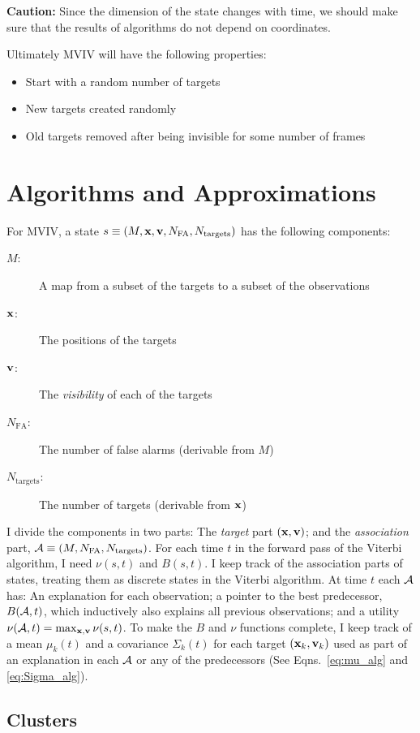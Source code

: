 \documentclass[12pt]{article}
\newcommand{\cA}{{\cal A}}
\begin{document}
\textbf{Caution:} Since the dimension of the state changes with time,
we should make sure that the results of algorithms do not depend on
coordinates.

Ultimately MVIV will have the following properties:
\begin{itemize}
\item Start with a random number of targets
\item New targets created randomly
\item Old targets removed after being invisible for some number of
  frames
\end{itemize}

\section{Algorithms and Approximations}
\label{sec:algorithms}

For MVIV, a state $s \equiv (M, {\mathbf{x}}, {\mathbf{v}}, N_{\text{FA}},
N_{\text{targets}})$ has the following components:
\begin{description}
\item[$M$:] A map from a subset of the targets to a subset of the observations
\item[${\mathbf{x}}$:] The positions of the targets
\item[${\mathbf{v}}$:] The \emph{visibility} of each of the targets
\item[$N_{\text{FA}}$:] The number of false alarms (derivable from $M$)
\item[$N_{\text{targets}}$:] The number of targets (derivable from ${\mathbf{x}}$)
\end{description}
I divide the components in two parts: The \emph{target} part
$({\mathbf{x}},{\mathbf{v}})$; and the \emph{association} part, $\cA \equiv (M,
N_{\text{FA}}, N_{\text{targets}})$.  For each time $t$ in the forward
pass of the Viterbi algorithm, I need $\nu(s,t)$ and $B(s,t)$.  I keep
track of the association parts of states, treating them as discrete
states in the Viterbi algorithm.  At time $t$ each $\cA$ has: An
explanation for each observation; a pointer to the best predecessor,
$B(\cA,t)$, which inductively also explains all previous observations;
and a utility $\nu(\cA,t) = \max_{\bx,\bv} \nu(s,t)$.  To make the $B$
and $\nu$ functions complete, I keep track of a mean $\mu_k(t)$ and a
covariance $\Sigma_k(t)$ for each target $({\mathbf{x}}_k,{\mathbf{v}}_k)$ used as part
of an explanation in each $\cA$ or any of the predecessors (See
Eqns.~\eqref{eq:mu_alg} and \eqref{eq:Sigma_alg}).

\subsection{Clusters}
\label{sec:clusters}
\end{document}
